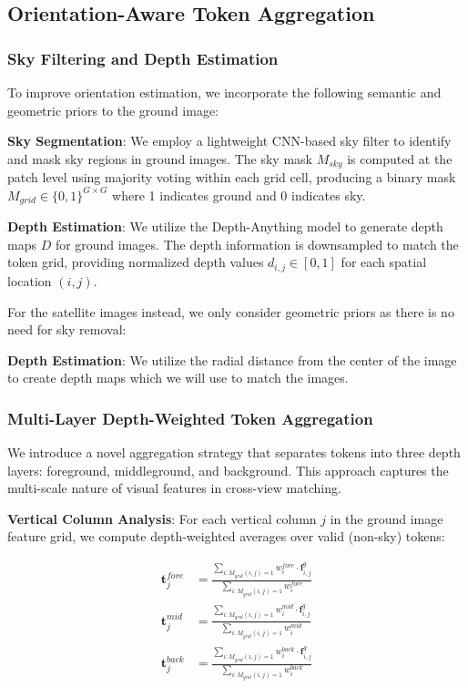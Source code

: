 \documentclass{bmvc2k}
\begin{document}
\subsection{Orientation-Aware Token Aggregation}

\subsubsection{Sky Filtering and Depth Estimation}

To improve orientation estimation, we incorporate the following semantic and geometric priors to the ground image:

\textbf{Sky Segmentation}: We employ a lightweight CNN-based sky filter to identify and mask sky regions in ground images. The sky mask $M_{sky}$ is computed at the patch level using majority voting within each grid cell, producing a binary mask $M_{grid} \in \{0,1\}^{G \times G}$ where 1 indicates ground and 0 indicates sky.

\textbf{Depth Estimation}: We utilize the Depth-Anything model to generate depth maps $D$ for ground images. The depth information is downsampled to match the token grid, providing normalized depth values $d_{i,j} \in [0,1]$ for each spatial location $(i,j)$.

For the satellite images instead, we only consider geometric priors as there is no need for sky removal:

\textbf{Depth Estimation}: We utilize the radial distance from the center of the image to create depth maps which we will use to match the images.

\subsubsection{Multi-Layer Depth-Weighted Token Aggregation}

We introduce a novel aggregation strategy that separates tokens into three depth layers: foreground, middleground, and background. This approach captures the multi-scale nature of visual features in cross-view matching.

\textbf{Vertical Column Analysis}: For each vertical column $j$ in the ground image feature grid, we compute depth-weighted averages over valid (non-sky) tokens:

\begin{align}
\mathbf{t}_j^{fore} &= \frac{\sum_{i: M_{grid}(i,j)=1} w_i^{fore} \cdot \mathbf{f}_{i,j}^g}{\sum_{i: M_{grid}(i,j)=1} w_i^{fore}} \\
\mathbf{t}_j^{mid} &= \frac{\sum_{i: M_{grid}(i,j)=1} w_i^{mid} \cdot \mathbf{f}_{i,j}^g}{\sum_{i: M_{grid}(i,j)=1} w_i^{mid}} \\
\mathbf{t}_j^{back} &= \frac{\sum_{i: M_{grid}(i,j)=1} w_i^{back} \cdot \mathbf{f}_{i,j}^g}{\sum_{i: M_{grid}(i,j)=1} w_i^{back}}
\end{align}
\end{document}
